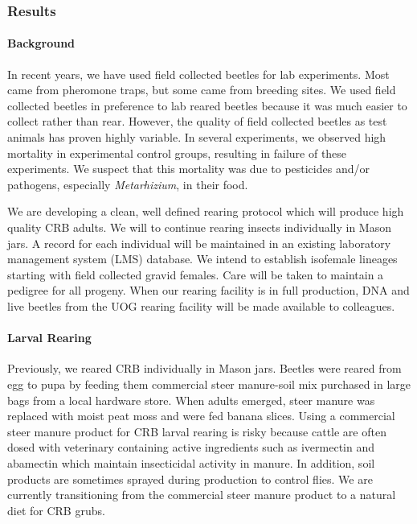 \documentclass[12pt,letterpaper,english,bibliography=totocnumbered,abstract=on]{scrartcl}
\begin{document}
\subsubsection{Results}

\paragraph{Background}

In recent years, we have used field collected beetles for lab experiments.  Most came from pheromone traps, but some came from breeding sites. We used field collected beetles in preference to lab reared beetles because it was much easier to collect rather than rear. However, the quality of field collected beetles as test animals has proven highly variable. In several experiments, we observed high mortality in experimental control groups, resulting in failure of these experiments. We suspect that this mortality was due to pesticides and/or pathogens, especially \textit{Metarhizium}, in their food. 

We are developing a clean, well defined rearing protocol which will produce high quality CRB adults. We will to continue rearing insects individually in Mason jars. A record for each individual will be maintained in an existing laboratory management system (LMS) database. We intend to establish isofemale lineages starting with field collected gravid females. Care will be taken to maintain a pedigree for all progeny. When our rearing facility is in full production, DNA and live beetles from the UOG rearing facility will be made available to colleagues.


\paragraph{Larval Rearing}

Previously, we reared CRB individually in Mason jars. Beetles were reared from egg to pupa by feeding them commercial steer manure-soil mix purchased in large bags from a local hardware store. When adults emerged, steer manure was replaced with moist peat moss and were fed banana slices. Using a commercial steer manure product for CRB larval rearing is risky because cattle are often dosed with veterinary containing active ingredients such as ivermectin and abamectin which maintain insecticidal activity in manure. In addition, soil products are sometimes sprayed during production to control flies. We are currently transitioning from the commercial steer manure product to a natural diet for CRB grubs.
\end{document}
